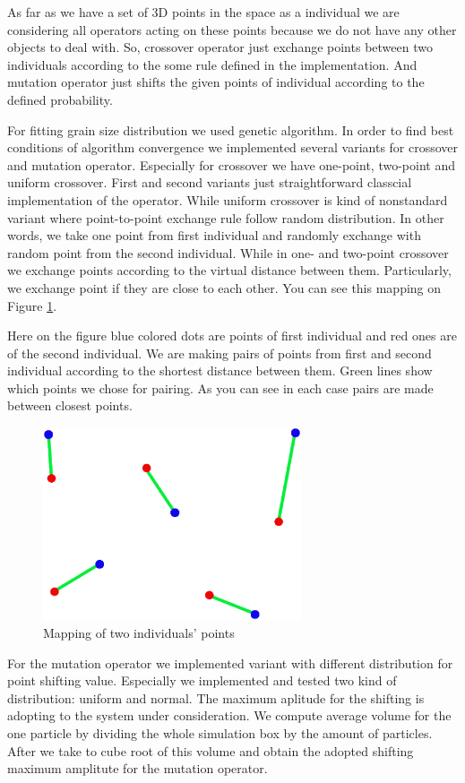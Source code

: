 \documentclass{article}
\begin{document}
As far as we have a set of 3D points in the space as a individual we are considering all operators acting on these points because we do not have any other objects to deal with.
So, crossover operator just exchange points between two individuals according to the some rule defined in the implementation. And mutation operator just shifts the given points of individual according to the defined probability.

For fitting grain size distribution we used genetic algorithm. In order to find best conditions of algorithm convergence we implemented several variants for crossover and mutation operator. Especially for crossover we have one-point, two-point and uniform crossover. First and second variants just straightforward classcial implementation of the operator. While uniform crossover is kind of nonstandard variant where point-to-point exchange rule follow random distribution. In other words, we take one point from first individual and randomly exchange with random point from the second individual. While in one- and two-point crossover we exchange points according to the virtual distance between  them. Particularly, we exchange point if they are close to each other. You can see this mapping on Figure \ref{mappingindividuals}.

Here on the figure blue colored dots are points of first individual and red ones are of the second individual. We are making pairs of points from first and second individual according to the shortest distance between them. Green lines show which points we chose for pairing. As you can see in each case pairs are made between closest points.
 
\begin{figure}
    \centering
    \includegraphics[width=3.0in]{individuals_map}
    \caption{Mapping of two individuals' points}
    \label{mappingindividuals}
\end{figure}

For the mutation operator we implemented variant with different distribution for point shifting value. Especially we implemented and tested two kind of distribution: uniform and normal. The maximum aplitude for the shifting is adopting to the system under consideration. We compute average volume for the one particle by dividing the whole simulation box by the amount of particles. After we take to cube root of this volume and obtain the adopted shifting maximum amplitute for the mutation operator.
\end{document}
